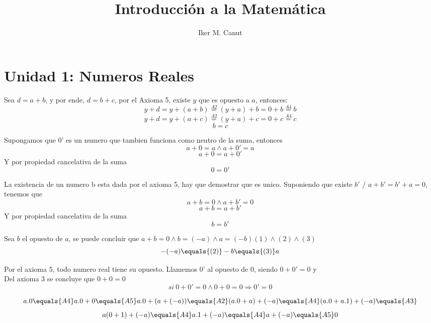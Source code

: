 \documentclass[10pt]{article}
\author{Iker M. Canut}
\begin{document}
\title{Introducción a la Matemática}
\maketitle
\date
\newpage

\tableofcontents
\newpage

\section{Unidad 1: Numeros Reales}

\begin{prf}{}
Sea $d=a+b$, y por ende, $d=b+c$, por el Axioma 5, existe $y$ que es opuesto  a $a$, entonces:
$$y+d=y+(a+b) \overset{A2}{=} (y+a)+b = 0 + b \overset{A4}{=}b$$
$$y+d=y+(a+c) \overset{A2}{=} (y+a)+c = 0 + c \overset{A4}{=}c$$
$$b=c$$
\end{prf}

\begin{prf}{}
Supongamos que 0' es un numero que tambien funciona como neutro de la suma, entonces
$$a+0=a \land a+0'=a$$
$$a+0=a+0'$$
Y por propiedad cancelativa de la suma
$$0=0'$$
\end{prf}

\begin{prf}{}
La existencia de un numero b esta dada por el axioma 5, hay que demostrar que es unico. Suponiendo que existe $b'$ / $a+b'=b'+a=0$, tenemos que
$$a+b=0 \land a+b'=0$$
$$a+b = a+b'$$
Y por propiedad cancelativa de la suma
$$b=b'$$
\end{prf}

\begin{prf}{}
Sea $b$ el opuesto de $a$, se puede concluir que $a+b=0 \land b=(-a) \land a=(-b)$\hfill$(1)\land(2)\land(3)$
$$-(-a)\equals{(2)}-b\equals{(3)}a$$
\end{prf}

\begin{prf}{}
Por el axioma 5, todo numero real tiene su opuesto. Llamemos 0' al opuesto de 0, siendo $0+0'=0$ y\\
Del axioma 3 se concluye que $0+0=0$
$$si\ 0+0'=0 \land 0+0=0 \Rightarrow 0'=0$$
\end{prf}

\begin{prf}{}
$$a.0 \equals{A4} a.0+0 \equals{A5} a.0+(a+(-a)) \equals{A2} (a.0+a)+(-a) \equals{A4} (a.0+a.1)+(-a) \equals{A3}$$
$$a(0+1)+(-a) \equals{A4} a.1+(-a) \equals{A4} a+(-a) \equals{A5} 0$$
\end{prf}
\end{document}
